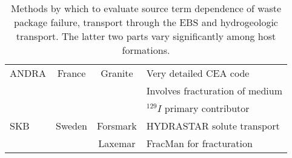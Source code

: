 \begin{table}[h!]
{\begin{tabular}{|l|c|c|l|}
      ANDRA \cite{andra_granite:_2005}                  & France      & Granite                   &  Very detailed CEA code  \\
                                                        &             &                           &  Involves fracturation of medium \\
                                                        &             &                           & $^{129}I$ primary contributor \\
      SKB \cite{ab_long-term_2006}                      & Sweden      & Forsmark                  &  HYDRASTAR solute transport\\
                                                        &             & Laxemar                   &  FracMan for fracturation\\
      \hline
    \end{tabular}
    \caption[Models of Source Term for Various Geologies]{Methods by which to 
    evaluate source term dependence of waste package failure, transport through 
    the \gls{EBS} and hydrogeologic transport. The latter two parts vary significantly among host formations. }
    \label{tab:geosource}
    }
  \end{table}
